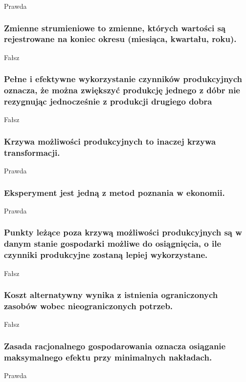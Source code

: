 \documentclass[a4paper,12pt]{article}
\begin{document}
Prawda

\subsubsection{Zmienne strumieniowe to zmienne, których wartości są rejestrowane na koniec okresu (miesiąca, kwartału, roku).}

Fałsz

\subsubsection{Pełne i efektywne wykorzystanie czynników produkcyjnych oznacza, że można zwiększyć produkcję jednego z  dóbr nie rezygnując jednocześnie z produkcji drugiego dobra}

Fałsz

\subsubsection{Krzywa możliwości produkcyjnych to inaczej krzywa transformacji.}

Prawda

\subsubsection{Eksperyment jest jedną z metod poznania w ekonomii.}

Prawda

\subsubsection{Punkty leżące poza krzywą możliwości produkcyjnych są w danym stanie gospodarki możliwe do osiągnięcia, o ile czynniki produkcyjne zostaną lepiej wykorzystane.}

Fałsz

\subsubsection{Koszt alternatywny wynika z istnienia ograniczonych zasobów wobec nieograniczonych potrzeb.}

Fałsz

\subsubsection{Zasada racjonalnego gospodarowania oznacza osiąganie maksymalnego efektu przy minimalnych nakładach.}

Prawda
\end{document}
